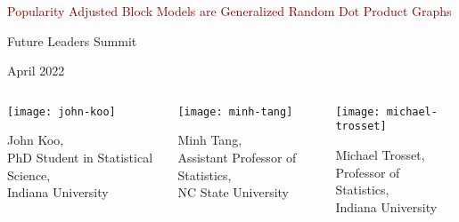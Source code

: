 \documentclass[
  ignorenonframetext,
]{beamer}
\author[John Koo]{John Koo}
\author{}
\date{\vspace{-2.5em}}
\begin{document}
\begin{frame}[plain]{}
\protect\hypertarget{section}{}
\center

\LARGE

\textcolor{darkred}{Popularity Adjusted Block Models are Generalized Random Dot Product Graphs}

\normalsize

Future Leaders Summit

April 2022

\begin{columns}[T]
\begin{column}{0.33\textwidth}
\begin{center}\texttt{[image: john-koo]} \end{center}

John Koo,\\
PhD Student in Statistical Science,\\
Indiana University
\end{column}

\begin{column}{0.33\textwidth}
\begin{center}\texttt{[image: minh-tang]} \end{center}

Minh Tang,\\
Assistant Professor of Statistics,\\
NC State University
\end{column}

\begin{column}{0.33\textwidth}
\begin{center}\texttt{[image: michael-trosset]} \end{center}

Michael Trosset,\\
Professor of Statistics,\\
Indiana University
\end{column}
\end{columns}
\end{frame}
\end{document}
